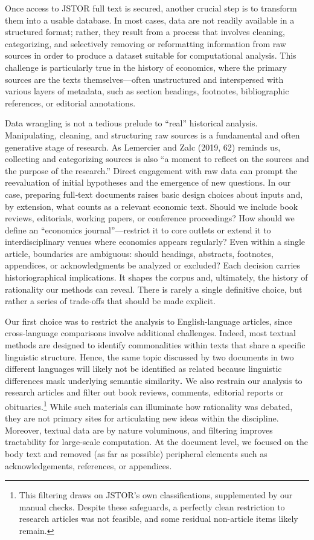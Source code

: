 \documentclass[
]{interact}
\begin{document}
Once access to JSTOR full text is secured, another crucial step is to
transform them into a usable database. In most cases, data are not
readily available in a structured format; rather, they result from a
process that involves cleaning, categorizing, and selectively removing
or reformatting information from raw sources in order to produce a
dataset suitable for computational analysis. This challenge is
particularly true in the history of economics, where the primary sources
are the texts themselves---often unstructured and interspersed with
various layers of metadata, such as section headings, footnotes,
bibliographic references, or editorial annotations.

Data wrangling is not a tedious prelude to ``real'' historical analysis.
Manipulating, cleaning, and structuring raw sources is a fundamental and
often generative stage of research. As Lemercier and Zalc (2019, 62)
reminds us, collecting and categorizing sources is also ``a moment to
reflect on the sources and the purpose of the research.'' Direct
engagement with raw data can prompt the reevaluation of initial
hypotheses and the emergence of new questions. In our case, preparing
full‐text documents raises basic design choices about inputs and, by
extension, what counts as a relevant economic text. Should we include
book reviews, editorials, working papers, or conference proceedings? How
should we define an ``economics journal''---restrict it to core outlets
or extend it to interdisciplinary venues where economics appears
regularly? Even within a single article, boundaries are ambiguous:
should headings, abstracts, footnotes, appendices, or acknowledgments be
analyzed or excluded? Each decision carries historiographical
implications. It shapes the corpus and, ultimately, the history of
rationality our methods can reveal. There is rarely a single definitive
choice, but rather a series of trade-offs that should be made explicit.

Our first choice was to restrict the analysis to English-language
articles, since cross-language comparisons involve additional
challenges. Indeed, most textual methods are designed to identify
commonalities within texts that share a specific linguistic structure.
Hence, the same topic discussed by two documents in two different
languages will likely not be identified as related because linguistic
differences mask underlying semantic similarity\textbf{.} We also
restrain our analysis to research articles and filter out book reviews,
comments, editorial reports or obituaries.\footnote{This filtering draws
  on JSTOR's own classifications, supplemented by our manual checks.
  Despite these safeguards, a perfectly clean restriction to research
  articles was not feasible, and some residual non-article items likely
  remain.} While such materials can illuminate how rationality was
debated, they are not primary sites for articulating new ideas within
the discipline. Moreover, textual data are by nature voluminous, and
filtering improves tractability for large-scale computation. At the
document level, we focused on the body text and removed (as far as
possible) peripheral elements such as acknowledgements, references, or
appendices.
\end{document}
